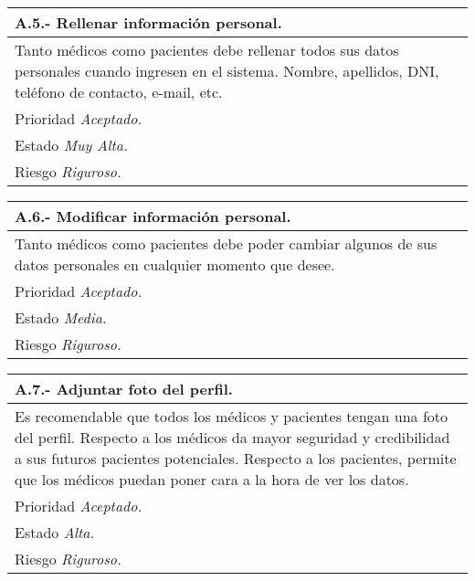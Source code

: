 \documentclass[a4paper,oneside,11pt]{book}
\begin{document}
\begin{center}
\begin{tabulary}{15cm}{|L|}
	\hline
		\bf{A.5.- Rellenar información personal.} \\
	\hline
		Tanto médicos como pacientes debe rellenar todos sus datos personales cuando ingresen en el sistema. Nombre, apellidos, DNI, teléfono de contacto, e-mail, etc. \\
	\hline
		Prioridad \textit{Aceptado.} \\
	\hline
		Estado \textit{Muy Alta.} \\
	\hline
		Riesgo \textit{Riguroso.} \\
	\hline
\end{tabulary}
\end{center}

\begin{center}
\begin{tabulary}{15cm}{|L|}
	\hline
		\bf{A.6.- Modificar información personal.} \\	
	\hline
		Tanto médicos como pacientes debe poder cambiar algunos de sus datos personales en cualquier momento que desee. \\
	\hline
		Prioridad \textit{Aceptado.} \\
	\hline
		Estado \textit{Media.} \\
	\hline
		Riesgo \textit{Riguroso.} \\
	\hline
\end{tabulary}
\end{center}

\begin{center}
\begin{tabulary}{15cm}{|L|}
	\hline
		\bf{A.7.- Adjuntar foto del perfil.} \\
	\hline
		Es recomendable que todos los médicos y pacientes tengan una foto del perfil. Respecto a los médicos da mayor seguridad y credibilidad a sus futuros pacientes potenciales. Respecto a los pacientes, permite que los médicos puedan poner cara a la hora de ver los datos. \\
	\hline
		Prioridad \textit{Aceptado.} \\
	\hline
		Estado \textit{Alta.} \\
	\hline
		Riesgo \textit{Riguroso.} \\
	\hline
\end{tabulary}
\end{center}
\end{document}
